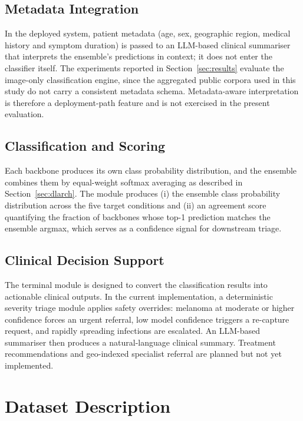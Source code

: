 \documentclass[pdflatex,sn-mathphys-num]{sn-jnl}%
\begin{document}
\subsection{Metadata Integration}

In the deployed system, patient metadata (age, sex, geographic region, medical history and
symptom duration) is passed to an LLM-based clinical summariser that interprets the ensemble's
predictions in context; it does not enter the classifier itself. The experiments reported in
Section~\ref{sec:results} evaluate the image-only classification engine, since the aggregated
public corpora used in this study do not carry a consistent metadata schema. Metadata-aware
interpretation is therefore a deployment-path feature and is not exercised in the present
evaluation.

\subsection{Classification and Scoring}

Each backbone produces its own class probability distribution, and the ensemble combines
them by equal-weight softmax averaging as described in Section~\ref{sec:dlarch}. The module
produces (i) the ensemble class probability distribution across the five target conditions
and (ii) an agreement score quantifying the fraction of backbones whose top-1 prediction
matches the ensemble argmax, which serves as a confidence signal for downstream triage.

\subsection{Clinical Decision Support}

The terminal module is designed to convert the classification results into actionable clinical
outputs. In the current implementation, a deterministic severity triage module applies safety
overrides: melanoma at moderate or higher confidence forces an urgent referral, low model
confidence triggers a re-capture request, and rapidly spreading infections are escalated. An
LLM-based summariser then produces a natural-language clinical summary. Treatment
recommendations and geo-indexed specialist referral are planned but not yet implemented.

\section{Dataset Description}\label{sec:dataset}
\end{document}
